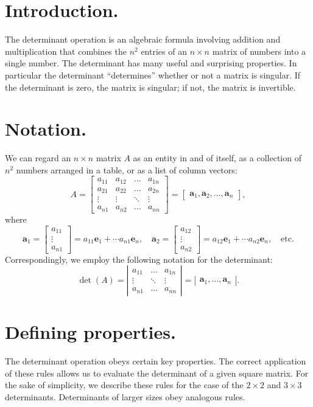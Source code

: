 \documentclass[12pt]{article}
\newcommand{\ba}{\mathbf{a}}
\newcommand{\be}{\mathbf{e}}
\newcommand{\bmat}[1]{\begin{bmatrix}#1\end{bmatrix}}
\newcommand{\vmat}[1]{\left|\begin{matrix}#1\end{matrix}\right|}
\begin{document}
\section{Introduction.}  The determinant operation is an algebraic
formula involving addition and multiplication that combines the $n^2$
entries of an $n\times n$ matrix of numbers into a single number.  
The determinant has many useful and surprising properties.  In
particular the determinant ``determines'' whether or not a matrix is
singular.  If the determinant is zero, the matrix is singular; if not,
the matrix is invertible.

\section{Notation.} 
We can regard an $n\times n$ matrix $A$ as an entity in and of itself,
as a collection of $n^2$ numbers arranged in a table, or as a list of
column vectors:
\[A= \bmat{a_{11} & a_{12} &\ldots & a_{1n} \\
  a_{21} & a_{22} & \ldots & a_{2n} \\
  \vdots & \vdots &\ddots & \vdots \\ a_{n1} & a_{n2} & \ldots &
  a_{nn}} = \bmat{ \ba_1, \ba_2,\ldots, \ba_n}, \] where
\[ \ba_1 = \bmat{a_{11}\\ \vdots \\ a_{n1}} = a_{11} \be_1 + \cdots
a_{n1} \be_n,\quad
\ba_2 = \bmat{a_{12}\\ \vdots \\ a_{n2}} = a_{12} \be_1 + \cdots
a_{n2} \be_n,\quad \text{etc.}\]
Correspondingly, we employ the following notation for the determinant:
  \[\det(A)=\vmat{a_{11} & \ldots & a_{1n} \\
    \vdots & \ddots & \vdots \\ a_{n1} & \ldots & a_{nn}} 
  = \vmat{ \ba_1 ,  \ldots, \ba_n}.\]

\section{Defining properties.}  The determinant operation obeys
certain key properties.  The correct application of these rules allows
us to evaluate the determinant of a given square matrix.  For the sake
of simplicity, we describe these rules for the case of the $2\times 2$
and $3\times 3$
determinants.  Determinants of larger sizes obey analogous rules.
\end{document}
